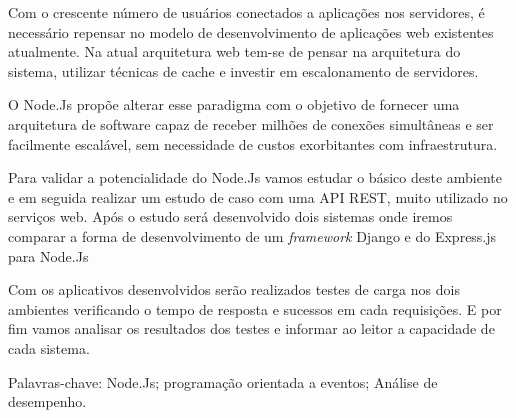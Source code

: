 \begin{resumo}
\vspace{-1cm}

\onehalfspacing

\noindent
  
  
  Com o crescente número de usuários conectados a aplicações nos servidores,
  é necessário repensar no modelo de desenvolvimento de aplicações web existentes atualmente.
  Na atual arquitetura web tem-se de pensar na arquitetura do sistema, utilizar técnicas de cache e 
  investir em escalonamento de servidores.  
  
  O Node.Js propõe alterar esse paradigma com o objetivo de fornecer uma arquitetura de software 
  capaz de receber milhões de conexões simultâneas e ser facilmente escalável, 
  sem necessidade de custos exorbitantes com infraestrutura.
  
  Para validar a potencialidade do Node.Js vamos estudar o básico deste ambiente e em seguida realizar um
  estudo de caso com uma API REST, muito utilizado no serviços web. Após o estudo será desenvolvido
  dois sistemas onde iremos comparar a forma de desenvolvimento de um \textit{framework} Django e 
  do  Express.js para Node.Js
  
  Com os aplicativos desenvolvidos serão realizados testes de carga nos dois ambientes verificando o tempo
  de resposta e sucessos em cada requisições. E por fim vamos analisar os resultados dos testes e informar
  ao leitor a capacidade de cada sistema.

\vspace*{.75cm}

\noindent Palavras-chave: Node.Js; programação orientada a eventos; Análise de desempenho.\\

\end{resumo}